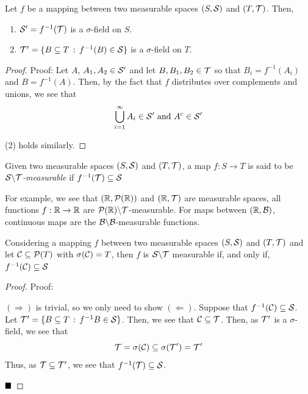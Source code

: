 
\begin{lemma}
    Let $f$ be a mapping between two measurable spaces $(S, \cal{S})$ and $(T, \cal{T})$. Then, 
    \begin{enumerate}
        \item $\cal{S}' = f^{-1}(\cal{T})$ is a $\sigma$-field on $S$. 
        \item $\cal{T}' = \{B \subseteq T \col f^{-1}(B) \in \cal{S}\}$ is a $\sigma$-field on $T$. 
    \end{enumerate}
\end{lemma}
\begin{proof}{Proof:}
    Let $A$, $A_1, A_2 \in \cal{S}'$ and let $B, B_1, B_2 \in \cal{T}$ so that $B_i = f^{-1}(A_i)$ and $B = f^{-1}(A)$. Then, by the fact that $f$ distributes over complements and unions, we see that
    \[ \bigcup_{i = 1}^{\infty} A_i \in \cal{S}' \text{ and } A^{c} \in \cal{S'} \]
    
    (2) holds similarly. 
\end{proof}

\begin{definition}
    Given two measurable spaces $(S, \cal{S})$ and $(T, \cal{T})$, a map $f : S \to T$ is said to be \emph{$\cal{S} \backslash \cal{T}$-measurable} if $f^{-1}(\cal{T}) \subseteq \cal{S}$
\end{definition}

For example, we see that $(\R, \cal{P}(\R))$ and $(\R, \cal{T})$ are measurable spaces, all functions $f : \R \to \R$ are $\cal{P}(\R) \backslash \cal{T}$-measurable. For maps between $(\R, \cal{B})$, continuous maps are the $\cal{B}\backslash \cal{B}$-measurable functions.

\begin{lemma}
    Considering a mapping $f$ between two measurable spaces $(S, \cal{S})$ and $(T, \cal{T})$ and let $\cal{C} \subseteq \cal{P}(T)$ with $\sigma(\cal{C}) = T$, then $f$ is $\cal{S}\backslash \cal{T}$ measurable if, and only if, $f^{-1}(\cal{C}) \subseteq \cal{S}$
\end{lemma}
\begin{proof}{Proof:}
    
    $(\Rightarrow)$ is trivial, so we only need to show $(\Leftarrow)$. Suppose that $f^{-1}(\cal{C}) \subseteq \cal{S}$.\\

    Let $\cal{T}' = \{B \subseteq T \col f^{-1}B \in \cal{S}\}$. Then, we see that $\cal{C} \subseteq \cal{T}$. Then, as $\cal{T'}$ is a $\sigma$-field, we see that
    \[ \cal{T} = \sigma(\cal{C}) \subseteq \sigma(\cal{T}') = \cal{T'} \]
    Thus, as $\cal{T} \subseteq \cal{T'}$, we see that $f^{-1}(\cal{T}) \subseteq \cal{S}$. 

    $\qed$
\end{proof}

